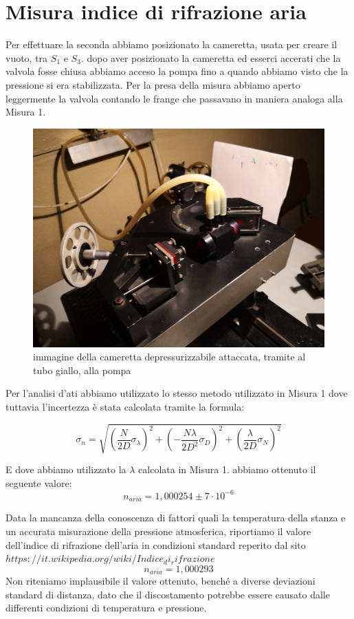 \documentclass{article}
\begin{document}
\pagebreak
\section{Misura indice di rifrazione aria}
Per effettuare la seconda abbiamo posizionato la cameretta, usata per creare il vuoto, tra $S_1$ e $S_3$. dopo aver posizionato la cameretta ed esserci accerati che la valvola fosse chiusa abbiamo acceso la pompa fino a quando abbiamo visto che la pressione si era stabilizzata. Per la presa della misura abbiamo aperto leggermente la valvola contando le frange che passavano in maniera analoga alla Misura 1.

\begin{figure}[h!]
  \centering
  \includegraphics[width=0.6\linewidth]{IM cameretta}
  \caption{immagine della cameretta depressurizzabile attaccata, tramite al tubo giallo, alla pompa}
\end{figure}

\pagebreak
Per l'analisi d'ati abbiamo utilizzato lo stesso metodo utilizzato in Misura 1 dove tuttavia l'incertezza è stata calcolata tramite la formula:

\begin{equation}
\sigma_n = \sqrt{ (\frac{N}{2D} \sigma_\lambda)^2 + ({-} \frac{N \lambda}{2 D^2} \sigma_D)^2 + (\frac{\lambda}{2D} \sigma_N)^2} 
\end{equation}

E dove abbiamo utilizzato la $\lambda$ calcolata in Misura 1. abbiamo ottenuto il seguente valore:
\[ n_{aria} = 1,000254 \pm 7 \cdot 10^{-6} \]

Data la mancanza della conoscenza di fattori quali la temperatura della stanza e un accurata misurazione della pressione atmosferica, riportiamo il valore dell'indice di rifrazione dell'aria in condizioni standard reperito dal sito ${https://it.wikipedia.org/wiki/Indice_di_rifrazione}$
\[ n_{aria} = 1,000293  \]
Non riteniamo implausibile il valore ottenuto, benché a diverse deviazioni standard di distanza,  dato che il discostamento potrebbe essere causato dalle differenti condizioni di temperatura e pressione.
\end{document}
